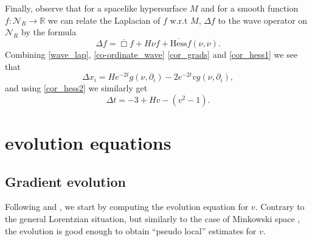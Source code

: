 \documentclass[leqno,11pt]{amsart}
\theoremstyle{definition}
\begin{document}
Finally, observe that for a spacelike hypersurface $M$ and for a smooth function $f:\mathcal{N}_R\rightarrow \mathbb{R}$  we can relate the Laplacian of $f$ w.r.t $M$, $\Delta f$ to the wave operator on $\mathcal{N}_R$ by the formula
\begin{equation}\label{wave_lap}
\Delta f= \bar{\Box} f +H\nu f+ \overline{\mathrm{Hess}}f(\nu,\nu).
\end{equation}
Combining  \eqref{wave_lap}, \eqref{co-ordinate_wave} \eqref{cor_grads} and  \eqref{cor_hess1} we see that
\begin{equation}\label{delta_xieq}
\Delta x_i=He^{-2t}g(\nu,\partial_i)-2e^{-2t}vg(\nu,\partial_{i}),
\end{equation}
and using  \eqref{cor_hess2} we similarly get
\begin{equation}\label{delta_teq}
\Delta t= -3+Hv-(v^2-1).
\end{equation}




\section{evolution equations}
\subsection*{Gradient evolution} Following \cite{Bartnik} and \cite{Ecker_Huisken_lor}, we start by computing the evolution equation for $v$. Contrary to the general Lorentzian situation, but similarly to the case of Minkowski space \cite{Ecker_mink}, the evolution is good enough to obtain ``pseudo local'' estimates for $v$.  
\end{document}
